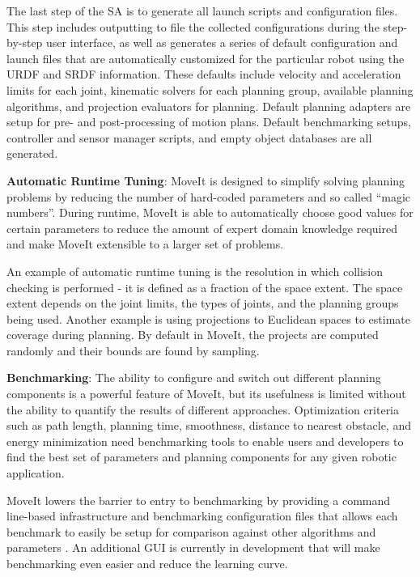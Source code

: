 \documentclass[10pt,journal,compsoc]{joser1}
\begin{document}
{The last step of the SA is to generate all launch scripts and configuration files. This step includes outputting to file the collected configurations during the step-by-step user interface, as well as generates a series of default configuration and launch files that are automatically customized for the particular robot using the URDF and SRDF information. These defaults include velocity and acceleration limits for each joint, kinematic solvers for each planning group, available planning algorithms, and projection evaluators for planning. Default planning adapters are setup for pre- and post-processing of motion plans. Default benchmarking setups, controller and sensor manager scripts, and empty object databases are all generated. 

{\bf Automatic Runtime Tuning}: MoveIt is designed to simplify solving planning problems by reducing the number of hard-coded parameters and so called ``magic numbers''. During runtime, MoveIt is able to automatically choose good values for certain parameters to reduce the amount of expert domain knowledge required and make MoveIt extensible to a larger set of problems. 

An example of automatic runtime tuning is the resolution in which collision checking is performed - it is defined as a fraction of the space extent. The space extent depends on the joint limits, the types of joints, and the planning groups being used. Another example is using projections to Euclidean spaces to estimate coverage during planning. By default in MoveIt, the projects are computed randomly and their bounds are found by sampling.

{\bf Benchmarking}: The ability to configure and switch out different planning components is a powerful feature of MoveIt, but its usefulness is limited without the ability to quantify the results of different approaches. Optimization criteria such as path length, planning time, smoothness, distance to nearest obstacle, and energy minimization need benchmarking tools to enable users and developers to find the best set of parameters and planning components for any given robotic application.

MoveIt lowers the barrier to entry to benchmarking by providing a command line-based infrastructure and benchmarking configuration files that allows each benchmark to easily be setup for comparison against other algorithms and parameters \cite{cohen2012generic}. An additional GUI is currently in development that will make benchmarking even easier and reduce the learning curve.

}
\end{document}

